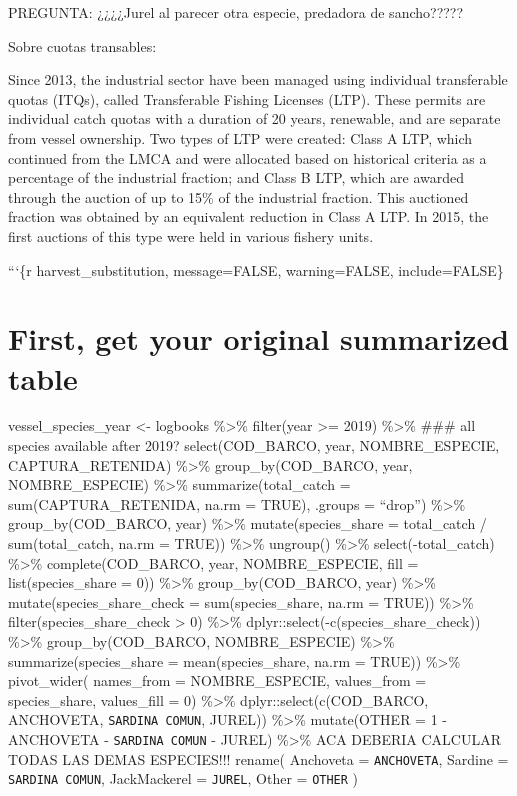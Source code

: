 PREGUNTA: ¿¿¿¿Jurel al parecer otra especie, predadora de sancho?????

Sobre cuotas transables:

Since 2013, the industrial sector have been managed using individual
transferable quotas (ITQs), called Transferable Fishing Licenses (LTP).
These permits are individual catch quotas with a duration of 20 years,
renewable, and are separate from vessel ownership. Two types of LTP were
created: Class A LTP, which continued from the LMCA and were allocated
based on historical criteria as a percentage of the industrial fraction;
and Class B LTP, which are awarded through the auction of up to 15\% of
the industrial fraction. This auctioned fraction was obtained by an
equivalent reduction in Class A LTP. In 2015, the first auctions of this
type were held in various fishery units.

```\{r harvest\_substitution, message=FALSE, warning=FALSE,
include=FALSE\}

\hypertarget{first-get-your-original-summarized-table}{%
\section{First, get your original summarized
table}\label{first-get-your-original-summarized-table}}

vessel\_species\_year \textless- logbooks \%\textgreater\% filter(year
\textgreater= 2019) \%\textgreater\% \#\#\# all species available after
2019? select(COD\_BARCO, year, NOMBRE\_ESPECIE, CAPTURA\_RETENIDA)
\%\textgreater\% group\_by(COD\_BARCO, year, NOMBRE\_ESPECIE)
\%\textgreater\% summarize(total\_catch = sum(CAPTURA\_RETENIDA, na.rm =
TRUE), .groups = ``drop'') \%\textgreater\% group\_by(COD\_BARCO, year)
\%\textgreater\% mutate(species\_share = total\_catch /
sum(total\_catch, na.rm = TRUE)) \%\textgreater\% ungroup()
\%\textgreater\% select(-total\_catch) \%\textgreater\%
complete(COD\_BARCO, year, NOMBRE\_ESPECIE, fill = list(species\_share =
0)) \%\textgreater\% group\_by(COD\_BARCO, year) \%\textgreater\%
mutate(species\_share\_check = sum(species\_share, na.rm = TRUE))
\%\textgreater\% filter(species\_share\_check \textgreater{} 0)
\%\textgreater\% dplyr::select(-c(species\_share\_check))
\%\textgreater\% group\_by(COD\_BARCO, NOMBRE\_ESPECIE) \%\textgreater\%
summarize(species\_share = mean(species\_share, na.rm = TRUE))
\%\textgreater\% pivot\_wider( names\_from = NOMBRE\_ESPECIE,
values\_from = species\_share, values\_fill = 0) \%\textgreater\%
dplyr::select(c(COD\_BARCO, ANCHOVETA, \texttt{SARDINA\ COMUN}, JUREL))
\%\textgreater\% mutate(OTHER = 1 - ANCHOVETA - \texttt{SARDINA\ COMUN}
- JUREL) \%\textgreater\% ACA DEBERIA CALCULAR TODAS LAS DEMAS
ESPECIES!!! rename( Anchoveta = \texttt{ANCHOVETA}, Sardine =
\texttt{SARDINA\ COMUN}, JackMackerel = \texttt{JUREL}, Other =
\texttt{OTHER} )

